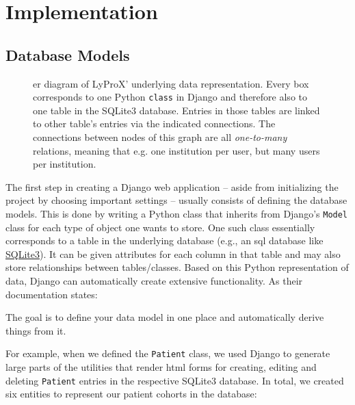 \documentclass[\relativeRoot/main.tex]{subfiles}
\begin{document}
\section{Implementation}
\label{sec:lyprox:implementation}

\subsection*{Database Models}
\label{subsec:lyprox:implementation:models}

\begin{figure}
    \centering
    \def\svgwidth{1.0\textwidth}
    
    \caption[
        ER diagram of LyProX' data model
    ]{
        \Gls{er} diagram of LyProX' underlying data representation. Every box corresponds to one Python \texttt{class} in Django and therefore also to one table in the SQLite3 database. Entries in those tables are linked to other table's entries via the indicated connections. The connections between nodes of this graph are all \emph{one-to-many} relations, meaning that e.g. one institution per user, but many users per institution.
    }
    \label{fig:lyprox:er_diagram}
\end{figure}

The first step in creating a Django web application -- aside from initializing the project by choosing important settings -- usually consists of defining the database models. This is done by writing a Python class that inherits from Django's \texttt{Model} class for each type of object one wants to store. One such class essentially corresponds to a table in the underlying database (e.g., an \acrshort{sql} database like \href{https://www.sqlite.org/index.html}{SQLite3}). It can be given attributes for each column in that table and may also store relationships between tables/classes. Based on this Python representation of data, Django can automatically create extensive functionality. As their documentation states: 

\begin{displayquote}
    The goal is to define your data model in one place and automatically derive things from it.
\end{displayquote}

For example, when we defined the \texttt{Patient} class, we used Django to generate large parts of the utilities that render \acrshort{html} forms for creating, editing and deleting \texttt{Patient} entries in the respective SQLite3 database. In total, we created six entities to represent our patient cohorts in the database:
\end{document}
